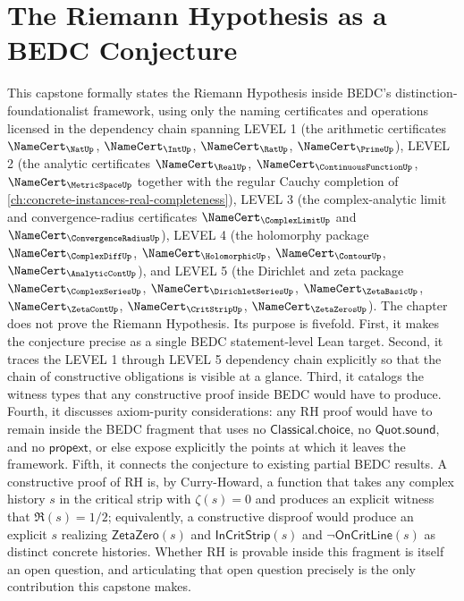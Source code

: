 \chapter{The Riemann Hypothesis as a BEDC Conjecture}
\label{ch:concrete-instances-riemann-hypothesis}

This capstone formally states the Riemann Hypothesis inside BEDC's distinction-foundationalist framework, using only the naming certificates and operations licensed in the dependency chain spanning LEVEL 1 (the arithmetic certificates $\NameCert_{\NatUp}$, $\NameCert_{\IntUp}$, $\NameCert_{\RatUp}$, $\NameCert_{\PrimeUp}$), LEVEL 2 (the analytic certificates $\NameCert_{\RealUp}$, $\NameCert_{\ContinuousFunctionUp}$, $\NameCert_{\MetricSpaceUp}$ together with the regular Cauchy completion of \autoref{ch:concrete-instances-real-completeness}), LEVEL 3 (the complex-analytic limit and convergence-radius certificates $\NameCert_{\ComplexLimitUp}$ and $\NameCert_{\ConvergenceRadiusUp}$), LEVEL 4 (the holomorphy package $\NameCert_{\ComplexDiffUp}$, $\NameCert_{\HolomorphicUp}$, $\NameCert_{\ContourUp}$, $\NameCert_{\AnalyticContUp}$), and LEVEL 5 (the Dirichlet and zeta package $\NameCert_{\ComplexSeriesUp}$, $\NameCert_{\DirichletSeriesUp}$, $\NameCert_{\ZetaBasicUp}$, $\NameCert_{\ZetaContUp}$, $\NameCert_{\CritStripUp}$, $\NameCert_{\ZetaZerosUp}$). The chapter does not prove the Riemann Hypothesis. Its purpose is fivefold. First, it makes the conjecture precise as a single BEDC statement-level Lean target. Second, it traces the LEVEL 1 through LEVEL 5 dependency chain explicitly so that the chain of constructive obligations is visible at a glance. Third, it catalogs the witness types that any constructive proof inside BEDC would have to produce. Fourth, it discusses axiom-purity considerations: any RH proof would have to remain inside the BEDC fragment that uses no $\mathsf{Classical.choice}$, no $\mathsf{Quot.sound}$, and no $\mathsf{propext}$, or else expose explicitly the points at which it leaves the framework. Fifth, it connects the conjecture to existing partial BEDC results. A constructive proof of RH is, by Curry-Howard, a function that takes any complex history $s$ in the critical strip with $\zeta(s) = 0$ and produces an explicit witness that $\Re(s) = 1/2$; equivalently, a constructive disproof would produce an explicit $s$ realizing $\mathsf{ZetaZero}(s)$ and $\mathsf{InCritStrip}(s)$ and $\neg\mathsf{OnCritLine}(s)$ as distinct concrete histories. Whether RH is provable inside this fragment is itself an open question, and articulating that open question precisely is the only contribution this capstone makes.

